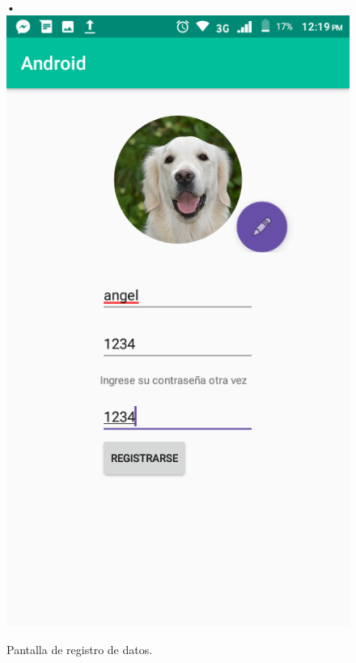 \begin{center}
\begin{figure}[H]
•\includegraphics[scale=0.3]{img/2.png}
\caption{Pantalla de registro de datos.}
\end{figure}
\end{center}

